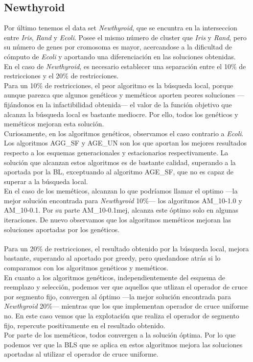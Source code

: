 \subsection{Newthyroid}
Por último tenemos el data set \emph{Newthyroid}, que se encuntra en la interseccion entre \emph{Iris}, \emph{Rand} y \emph{Ecoli}. Posee el mismo número de cluster que \emph{Iris} y \emph{Rand}, pero su número de genes por cromosoma es mayor, acercandose a la dificultad de cómputo de \emph{Ecoli} y aportando una diferenciación en las soluciones obtenidas.
\\
En el caso de \emph{Newthyroid}, es necesario establecer una separación entre el 10\% de restricciones y el 20\% de restricciones.
\\
Para un 10\% de restricciones, el peor algoritmo es la búsqueda local, porque aunque parezca que algunos genéticos y meméticos aporten peores soluciones ---fijándonos en la infactibilidad obtenida---  el valor de la función objetivo que alcanza la búsqueda local es bastante mediocre. Por ello, todos los genéticos y meméticos mejoran esta solución.
\\
Curiosamente, en los algoritmos genéticos, observamos el caso contrario a \emph{Ecoli}. Los algoritmos AGG\_SF y AGE\_UN son los que aportan los mejores resultados respecto a los esquemas generacionales y estacionarios respectivamente. La solución que alcanzan estos algoritmos es de bastante calidad, superando a la aportada por la BL, exceptuando al algoritmo AGE\_SF, que no es capaz de superar a la búsqueda local.
\\
En el caso de los meméticos, alcanzan lo que podríamos llamar el optimo ---la mejor solución encontrada para \emph{Newthyroid} 10\%--- los algoritmos AM\_10-1.0 y AM\_10-0.1. Por su parte AM\_10-0.1mej, alcanza este óptimo solo en algunas iteraciones. De nuevo observamos que los algoritmos meméticos mejoran las soluciones aportadas por los genéticos.\\
\\
Para un 20\% de restricciones, el resultado obtenido por la búsqueda local, mejora bastante, superando al aportado por greedy, pero quedandose atrás si lo comparamos con los algoritmos genéticos y meméticos.
\\
En cuanto a los algoritmos genéticos, independientemente del esquema de reemplazo y selección, podemos ver que aquellos que utlizan el operador de cruce por segmento fijo, convergen al óptimo ---la mejor solución encontrada para \emph{Newthyroid} 20\%--- mientras que los que implementan operador de cruce uniforme no. En este caso vemos que la explotación que realiza el operador de segmento fijo, repercute positivamente en el resultado obtenido.
\\
Por parte de los meméticos, todos convergen a la solución óptima. Por lo que podemos ver que la BLS que se aplica en estos algoritmos mejora las soluciones aportadas al utilizar el operador de cruce uniforme.


